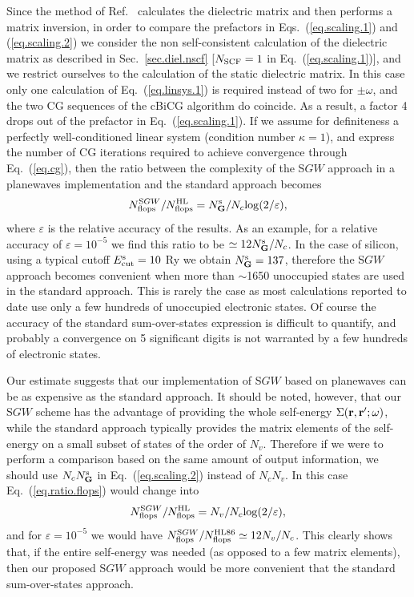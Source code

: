 \documentclass[twocolumn,prb,showpacs,superscriptaddress]{revtex4}
\def\w{\omega}
\def\G{{\bf G}}
\def\r{{\bf r}}
\def\rp{{\bf r^\prime}}
\begin{document}
Since the method of Ref.\  calculates the dielectric matrix and then performs a matrix inversion,
in order to compare the prefactors in Eqs.\ (\ref{eq.scaling.1}) and (\ref{eq.scaling.2})
we consider the non self-consistent calculation of the dielectric matrix as described in Sec.\ \ref{sec.diel.nscf}
[$N_{\rm SCF}=1$ in Eq.\ (\ref{eq.scaling.1})], and we restrict ourselves to 
the calculation of the static dielectric matrix.
In this case only one calculation of Eq.\ (\ref{eq.linsys.1}) is required instead of two for $\pm\w$, 
and the two CG sequences of the cBiCG algorithm do coincide.
As a result, a factor 4 drops out of the prefactor in Eq.\ (\ref{eq.scaling.1}).
If we assume for definiteness a perfectly well-conditioned linear system (condition number $\kappa=1$),
and express the number of CG iterations required to achieve convergence through Eq.\ (\ref{eq.cg}),
then the ratio between the complexity of the S$GW$ approach in a planewaves
implementation and the standard approach becomes
   \begin{equation}\label{eq.ratio.flops}
   N^{{\rm S}GW}_{\rm flops}/N^{\rm HL}_{\rm flops} = N_\G^{\rm s}/N_c {\rm log}(2/\varepsilon),
   \end{equation}
where $\varepsilon$ is the relative accuracy of the results.
As an example, for a relative accuracy of $\varepsilon=10^{-5}$ 
we find this ratio to be $\simeq 12 N_\G^{\rm s}/N_c$.
In the case of silicon, using a typical cutoff $E_{\rm cut}^{\rm s}=10$ Ry we obtain $N_\G^{\rm s}=137$, therefore
the S$GW$ approach becomes convenient when more than $\sim$1650 unoccupied states are used
in the standard approach.
This is rarely the case as most calculations reported to date use only a few hundreds of 
unoccupied electronic states.
Of course the accuracy of the standard sum-over-states expression is difficult to
quantify, and probably a convergence on 5 significant digits is not warranted by a few
hundreds of electronic states. 

Our estimate suggests that our implementation of S$GW$ 
based on planewaves can be as expensive as the standard approach.
It should be noted, however, that our S$GW$ scheme has the advantage of providing
the whole self-energy $\Sigma(\r,\rp;\w)$, while the standard approach 
typically provides the matrix elements of the self-energy on a small subset of states of the order of $N_v$. 
Therefore if we were to perform a comparison based on the
same amount of output information, we should use $N_c N_\G^{\rm s}$ in Eq.\ (\ref{eq.scaling.2})
instead of $N_c N_v$. In this case Eq.\ (\ref{eq.ratio.flops}) would change into
  \begin{equation}
  N^{{\rm S}GW}_{\rm flops}/N^{\rm HL}_{\rm flops} = N_v /N_c{\rm log}(2/\varepsilon),
  \end{equation}
and for $\varepsilon=10^{-5}$ we would have $N^{{\rm S}GW}_{\rm flops}/N^{\rm HL86}_{\rm flops}\simeq 12 N_v/N_c$.
This clearly shows that, if the entire self-energy was needed (as opposed to a few matrix elements),
then our proposed S$GW$ approach would be more convenient that the standard sum-over-states
approach.
\end{document}
